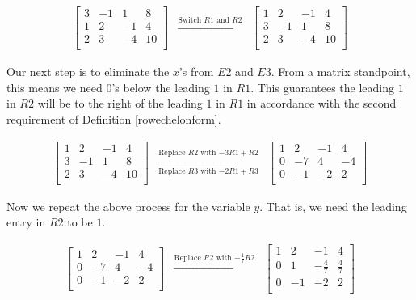 \documentclass{ximera}
\begin{document}
\begin{ex}
\[\begin{array}{ccc}
\left[ \begin{array}{rrr|r} 
3 & -1 & 1 & 8 \\ 
1 & 2 & -1 & 4 \\ 
2 & 3 & -4 & 10 \\ 
\end{array} \right]

& 

\xrightarrow{\text{Switch $R1$ and $R2$}}

&

\left[ \begin{array}{rrr|r}
1 & 2 & -1 & 4 \\  
3 & -1 & 1 & 8 \\ 
2 & 3 & -4 & 10 \\ 
\end{array} \right]


\end{array}\]



Our next step is to eliminate the $x$'s from $E2$ and $E3$.  From a matrix standpoint, this means we need $0$'s below the leading $1$ in $R1$.  This guarantees the leading $1$ in $R2$ will be to the right of the leading $1$ in $R1$ in accordance with the second requirement of Definition \ref{rowechelonform}.

\[\begin{array}{ccc}

\left[ \begin{array}{rrr|r}
1 & 2 & -1 & 4 \\  
3 & -1 & 1 & 8 \\ 
2 & 3 & -4 & 10 \\ 
\end{array} \right]
&
\xrightarrow[\text{Replace $R3$ with $-2R1+R3$}]{\text{Replace $R2$ with $-3R1 +R2$}} 
&
\left[ \begin{array}{rrr|r}  
1 & 2 & -1 & 4 \\  
0 & -7 & 4 & -4 \\ 
0 & -1 & -2  & 2 \\ 
\end{array} \right]



\end{array}\]

Now we repeat the above process for the variable $y$.  That is, we need the leading entry in $R2$ to be $1$.

\[\begin{array}{ccc}

\left[ \begin{array}{rrr|r}  
1 & 2 & -1 & 4 \\  
0 & -7 & 4 & -4 \\ 
0 & -1 & -2  & 2 \\ 
\end{array} \right]  
& 
\xrightarrow{\text{Replace $R2$ with $-\frac{1}{7}R2$}}  
& 
\left[ \begin{array}{rrr|r} 
1 & 2 & -1 & 4 \\ 
0 & 1 & -\frac{4}{7} & \frac{4}{7} \\ 
0 & -1 & -2 & 2 \\
\end{array} \right]


\end{array}\]
\end{ex}
\end{document}
